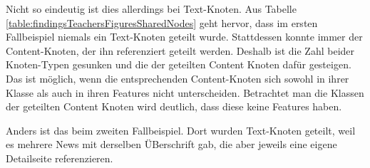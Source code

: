     Nicht so eindeutig ist dies allerdings bei Text-Knoten.
    Aus Tabelle \ref{table:findingsTeachersFiguresSharedNodes} geht hervor,
    dass im ersten Fallbeispiel niemals ein Text-Knoten geteilt wurde.
    Stattdessen konnte immer der Content-Knoten,
    der ihn referenziert geteilt werden.
    Deshalb ist die Zahl beider Knoten-Typen gesunken und die der geteilten
    Content Knoten dafür gesteigen.
    Das ist möglich, wenn die entsprechenden Content-Knoten
    sich sowohl in ihrer Klasse als auch in ihren Features nicht unterscheiden.
    Betrachtet man die Klassen der geteilten Content Knoten wird deutlich,
    dass diese keine Features haben.

    Anders ist das beim zweiten Fallbeispiel.
    Dort wurden Text-Knoten geteilt, weil es mehrere News mit derselben ÜBerschrift
    gab, die aber jeweils eine eigene Detailseite referenzieren.

    
